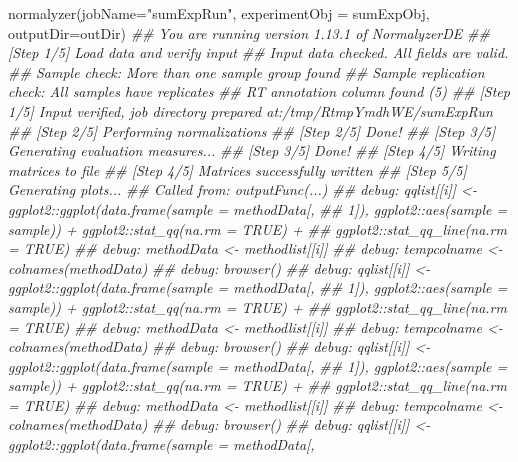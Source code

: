 \documentclass[]{article}
\newcommand{\hlstr}[1]{\textcolor[rgb]{0.251,0.627,0.251}{#1}}%
\newcommand{\hlcom}[1]{\textcolor[rgb]{0.502,0.502,0.502}{\textit{#1}}}%
\newcommand{\hlstd}[1]{\textcolor[rgb]{0.251,0.251,0.251}{#1}}%
\newenvironment{Shaded}{\begin{myshaded}}{\end{myshaded}}
\newcommand{\StringTok}[1]{\hlstr{#1}}
\newcommand{\DocumentationTok}[1]{\hlcom{#1}}
\newcommand{\FunctionTok}[1]{\hlstd{#1}}
\newcommand{\AttributeTok}[1]{{#1}}
\newcommand{\NormalTok}[1]{\hlstd{#1}}
\begin{document}
\begin{Shaded}
\begin{Highlighting}[]
\FunctionTok{normalyzer}\NormalTok{(}\AttributeTok{jobName=}\StringTok{"sumExpRun"}\NormalTok{, }\AttributeTok{experimentObj =}\NormalTok{ sumExpObj, }\AttributeTok{outputDir=}\NormalTok{outDir)}
\DocumentationTok{\#\# You are running version 1.13.1 of NormalyzerDE}
\DocumentationTok{\#\# [Step 1/5] Load data and verify input}
\DocumentationTok{\#\# Input data checked. All fields are valid.}
\DocumentationTok{\#\# Sample check: More than one sample group found}
\DocumentationTok{\#\# Sample replication check: All samples have replicates}
\DocumentationTok{\#\# RT annotation column found (5)}
\DocumentationTok{\#\# [Step 1/5] Input verified, job directory prepared at:/tmp/RtmpYmdhWE/sumExpRun}
\DocumentationTok{\#\# [Step 2/5] Performing normalizations}
\DocumentationTok{\#\# [Step 2/5] Done!}
\DocumentationTok{\#\# [Step 3/5] Generating evaluation measures...}
\DocumentationTok{\#\# [Step 3/5] Done!}
\DocumentationTok{\#\# [Step 4/5] Writing matrices to file}
\DocumentationTok{\#\# [Step 4/5] Matrices successfully written}
\DocumentationTok{\#\# [Step 5/5] Generating plots...}
\DocumentationTok{\#\# Called from: outputFunc(...)}
\DocumentationTok{\#\# debug: qqlist[[i]] \textless{}{-} ggplot2::ggplot(data.frame(sample = methodData[, }
\DocumentationTok{\#\#     1]), ggplot2::aes(sample = sample)) + ggplot2::stat\_qq(na.rm = TRUE) + }
\DocumentationTok{\#\#     ggplot2::stat\_qq\_line(na.rm = TRUE)}
\DocumentationTok{\#\# debug: methodData \textless{}{-} methodlist[[i]]}
\DocumentationTok{\#\# debug: tempcolname \textless{}{-} colnames(methodData)}
\DocumentationTok{\#\# debug: browser()}
\DocumentationTok{\#\# debug: qqlist[[i]] \textless{}{-} ggplot2::ggplot(data.frame(sample = methodData[, }
\DocumentationTok{\#\#     1]), ggplot2::aes(sample = sample)) + ggplot2::stat\_qq(na.rm = TRUE) + }
\DocumentationTok{\#\#     ggplot2::stat\_qq\_line(na.rm = TRUE)}
\DocumentationTok{\#\# debug: methodData \textless{}{-} methodlist[[i]]}
\DocumentationTok{\#\# debug: tempcolname \textless{}{-} colnames(methodData)}
\DocumentationTok{\#\# debug: browser()}
\DocumentationTok{\#\# debug: qqlist[[i]] \textless{}{-} ggplot2::ggplot(data.frame(sample = methodData[, }
\DocumentationTok{\#\#     1]), ggplot2::aes(sample = sample)) + ggplot2::stat\_qq(na.rm = TRUE) + }
\DocumentationTok{\#\#     ggplot2::stat\_qq\_line(na.rm = TRUE)}
\DocumentationTok{\#\# debug: methodData \textless{}{-} methodlist[[i]]}
\DocumentationTok{\#\# debug: tempcolname \textless{}{-} colnames(methodData)}
\DocumentationTok{\#\# debug: browser()}
\DocumentationTok{\#\# debug: qqlist[[i]] \textless{}{-} ggplot2::ggplot(data.frame(sample = methodData[, }

\end{Highlighting}
\end{Shaded}
\end{document}

